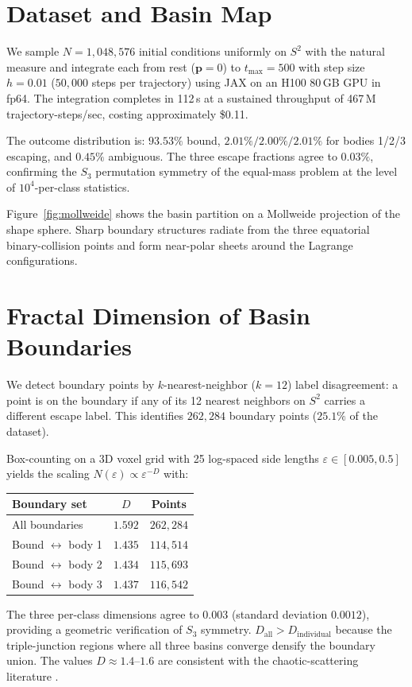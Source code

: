 \documentclass[twocolumn,prl]{revtex4-2}
\begin{document}
\section{Dataset and Basin Map}
\label{sec:dataset}

We sample $N = 1{,}048{,}576$ initial conditions uniformly on $S^2$
with the natural measure and integrate each from rest ($\mathbf{p} = 0$)
to $t_{\max} = 500$ with step size $h = 0.01$ ($50{,}000$ steps per
trajectory) using JAX on an H100 80\,GB GPU in fp64. The integration
completes in 112\,s at a sustained throughput of 467\,M
trajectory-steps/sec, costing approximately \$0.11.

The outcome distribution is: $93.53\%$ bound, $2.01\%/2.00\%/2.01\%$
for bodies 1/2/3 escaping, and $0.45\%$ ambiguous. The three escape
fractions agree to $0.03\%$, confirming the $S_3$ permutation symmetry
of the equal-mass problem at the level of $10^4$-per-class statistics.

Figure~\ref{fig:mollweide} shows the basin partition on a Mollweide
projection of the shape sphere. Sharp boundary structures radiate from
the three equatorial binary-collision points and form near-polar sheets
around the Lagrange configurations.


\section{Fractal Dimension of Basin Boundaries}
\label{sec:fractal}

We detect boundary points by $k$-nearest-neighbor ($k = 12$) label
disagreement: a point is on the boundary if any of its 12 nearest
neighbors on $S^2$ carries a different escape label. This identifies
$262{,}284$ boundary points ($25.1\%$ of the dataset).

Box-counting on a 3D voxel grid with 25 log-spaced side lengths
$\varepsilon \in [0.005, 0.5]$ yields the scaling
$N(\varepsilon) \propto \varepsilon^{-D}$ with:
%
\begin{center}
\begin{tabular}{lcc}
\toprule
Boundary set & $D$ & Points \\
\midrule
All boundaries  & $1.592$ & $262{,}284$ \\
Bound $\leftrightarrow$ body 1 & $1.435$ & $114{,}514$ \\
Bound $\leftrightarrow$ body 2 & $1.434$ & $115{,}693$ \\
Bound $\leftrightarrow$ body 3 & $1.437$ & $116{,}542$ \\
\bottomrule
\end{tabular}
\end{center}
%
The three per-class dimensions agree to $0.003$ (standard deviation
$0.0012$), providing a geometric verification of $S_3$ symmetry.
$D_{\mathrm{all}} > D_{\mathrm{individual}}$ because the triple-junction
regions where all three basins converge densify the boundary union.
The values $D \approx 1.4$--$1.6$ are consistent with the
chaotic-scattering literature \cite{Bleher1988, Ott2002}.
\end{document}
